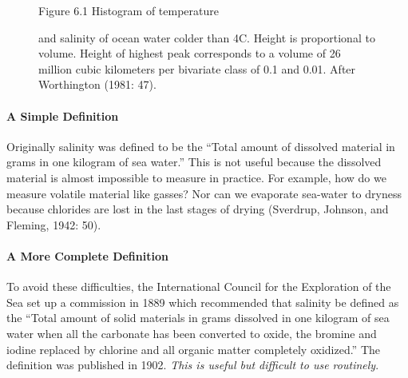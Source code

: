 \begin{figure}[t!]
\footnotesize
Figure 6.1 Histogram of temperature \rule{0mm}{3ex}and salinity of
ocean water colder than 4\degrees C. Height is proportional to
volume. Height of highest peak corresponds to a volume of 26 million
cubic kilometers per bivariate class of 0.1 and 0.01. After
Worthington (1981: 47).
\label{fig:salhistogram}
\vspace{-3ex}
\end{figure}

\paragraph{A Simple Definition}
Originally salinity was defined to be the
``Total amount of dissolved material in grams
in one kilogram of sea water.'' This is not useful because the
dissolved material is almost impossible to measure in practice. For
example, how do we measure volatile material like gasses? Nor can we
evaporate sea-water to dryness because chlorides are lost in the last
stages of drying (Sverdrup, Johnson, and Fleming, 1942: 50).

\paragraph{A More Complete Definition}
To avoid these difficulties, the International Council for the Exploration of the Sea
set up a commission in 1889 which recommended that salinity be defined
as the ``Total amount of solid materials in grams dissolved in one
kilogram of sea water when all the carbonate has been converted to
oxide, the bromine and iodine replaced by chlorine and all organic
matter completely oxidized.'' The definition was published in
1902. \textit{This is useful but difficult to use routinely}.

